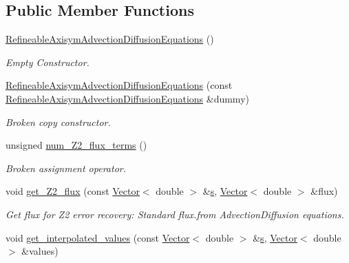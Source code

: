 \subsection*{Public Member Functions}
\begin{DoxyCompactItemize}
\item 
\hyperlink{classoomph_1_1RefineableAxisymAdvectionDiffusionEquations_af8b8b167798dd377d8c63e166f7b56cc}{Refineable\+Axisym\+Advection\+Diffusion\+Equations} ()
\begin{DoxyCompactList}\small\item\em Empty Constructor. \end{DoxyCompactList}\item 
\hyperlink{classoomph_1_1RefineableAxisymAdvectionDiffusionEquations_af90d33fc2e1dcf475f59ca5d8aefea22}{Refineable\+Axisym\+Advection\+Diffusion\+Equations} (const \hyperlink{classoomph_1_1RefineableAxisymAdvectionDiffusionEquations}{Refineable\+Axisym\+Advection\+Diffusion\+Equations} \&dummy)
\begin{DoxyCompactList}\small\item\em Broken copy constructor. \end{DoxyCompactList}\item 
unsigned \hyperlink{classoomph_1_1RefineableAxisymAdvectionDiffusionEquations_aaa412c73dd6158738d91c8a2f52df96e}{num\+\_\+\+Z2\+\_\+flux\+\_\+terms} ()
\begin{DoxyCompactList}\small\item\em Broken assignment operator. \end{DoxyCompactList}\item 
void \hyperlink{classoomph_1_1RefineableAxisymAdvectionDiffusionEquations_a1027fd155ab295492c9e4f4859e91b30}{get\+\_\+\+Z2\+\_\+flux} (const \hyperlink{classoomph_1_1Vector}{Vector}$<$ double $>$ \&\hyperlink{cfortran_8h_ab7123126e4885ef647dd9c6e3807a21c}{s}, \hyperlink{classoomph_1_1Vector}{Vector}$<$ double $>$ \&flux)
\begin{DoxyCompactList}\small\item\em Get \textquotesingle{}flux\textquotesingle{} for Z2 error recovery\+: Standard flux.\+from Advection\+Diffusion equations. \end{DoxyCompactList}\item 
void \hyperlink{classoomph_1_1RefineableAxisymAdvectionDiffusionEquations_aa5166d104d862bd73edb51deb5a24de0}{get\+\_\+interpolated\+\_\+values} (const \hyperlink{classoomph_1_1Vector}{Vector}$<$ double $>$ \&\hyperlink{cfortran_8h_ab7123126e4885ef647dd9c6e3807a21c}{s}, \hyperlink{classoomph_1_1Vector}{Vector}$<$ double $>$ \&values)

\end{DoxyCompactItemize}
